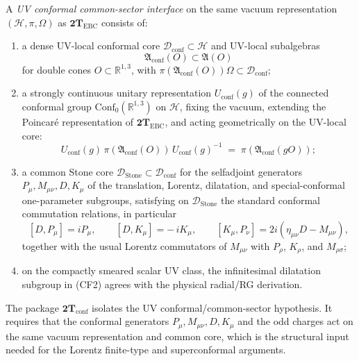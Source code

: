 \begin{definition}
\label{def:2T-conf}
A \emph{UV conformal common-sector interface} on the same vacuum representation
\((\mathcal H,\pi,\Omega)\) as \(\mathbf{2T}_{\mathrm{EBC}}\) consists of:
\begin{enumerate}[label=\textbf{(CF\arabic*)},leftmargin=*,itemsep=0.4em]
\item a dense UV-local conformal core \(\mathcal D_{\mathrm{conf}}\subset\mathcal H\)
  and UV-local subalgebras
  \[
  \mathfrak A_{\mathrm{conf}}(O)\subset \mathfrak A(O)
  \]
  for double cones \(O\subset\mathbb R^{1,3}\), with
  \(\pi(\mathfrak A_{\mathrm{conf}}(O))\Omega\subset\mathcal D_{\mathrm{conf}}\);
\item a strongly continuous unitary representation
  \(U_{\mathrm{conf}}(g)\) of the connected conformal group
  \(\mathrm{Conf}_0(\mathbb R^{1,3})\) on \(\mathcal H\), fixing the vacuum,
  extending the Poincar\'e representation of
  \(\mathbf{2T}_{\mathrm{EBC}}\), and acting geometrically on the UV-local core:
  \[
  U_{\mathrm{conf}}(g)\,\pi(\mathfrak A_{\mathrm{conf}}(O))\,U_{\mathrm{conf}}(g)^{-1}
  \;=\;
  \pi(\mathfrak A_{\mathrm{conf}}(gO));
  \]
\item a common Stone core
  \(\mathcal D_{\mathrm{Stone}}\subset\mathcal D_{\mathrm{conf}}\) for the selfadjoint
  generators \(P_\mu,M_{\mu\nu},D,K_\mu\) of the translation, Lorentz,
  dilatation, and special-conformal one-parameter subgroups, satisfying on
  \(\mathcal D_{\mathrm{Stone}}\) the standard conformal commutation relations,
  in particular
  \[
  [D,P_\mu]=iP_\mu,\qquad
  [D,K_\mu]=-\,iK_\mu,\qquad
  [K_\mu,P_\nu]=2i(\eta_{\mu\nu}D-M_{\mu\nu}),
  \]
  together with the usual Lorentz commutators of \(M_{\mu\nu}\) with
  \(P_\rho\), \(K_\rho\), and \(M_{\rho\sigma}\);
\item on the compactly smeared scalar UV class,
  the infinitesimal dilatation subgroup in \textnormal{(CF2)} agrees with the
  physical radial/RG derivation.
\end{enumerate}
\end{definition}

\begin{remark}
\label{rem:2T-conf-separate}
The package \(\mathbf{2T}_{\mathrm{conf}}\) isolates the UV
conformal/common-sector hypothesis. It requires that the conformal
generators \(P_\mu,M_{\mu\nu},D,K_\mu\) and the odd charges act on the same
vacuum representation and common core, which is the structural input needed for
the Lorentz finite-type and superconformal arguments.
\end{remark}


